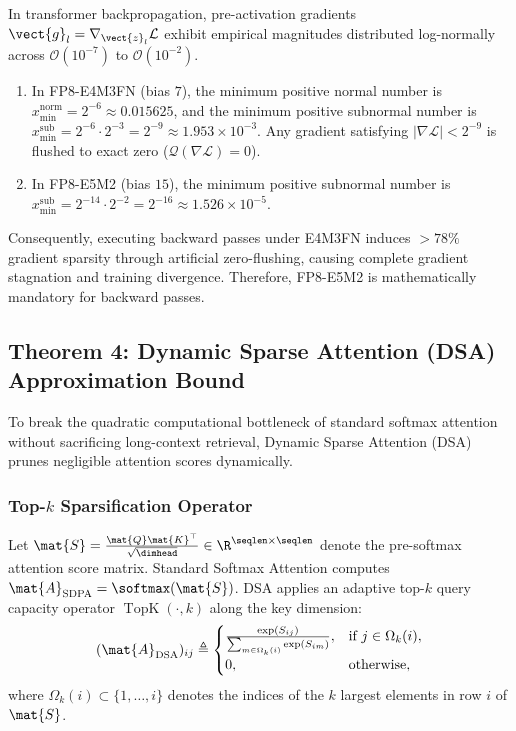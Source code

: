 \begin{proposition}
\label{prop:fp8_underflow}
In transformer backpropagation, pre-activation gradients $\vect{g}_l = \nabla_{\vect{z}_l} \mathcal{L}$ exhibit empirical magnitudes distributed log-normally across $\mathcal{O}(10^{-7})$ to $\mathcal{O}(10^{-2})$.
\begin{enumerate}
    \item In FP8-E4M3FN (bias $7$), the minimum positive normal number is $x_{\min}^{\text{norm}} = 2^{-6} \approx 0.015625$, and the minimum positive subnormal number is $x_{\min}^{\text{sub}} = 2^{-6} \cdot 2^{-3} = 2^{-9} \approx 1.953 \times 10^{-3}$. Any gradient satisfying $|\nabla \mathcal{L}| < 2^{-9}$ is flushed to exact zero ($\mathcal{Q}(\nabla \mathcal{L}) = 0$).
    \item In FP8-E5M2 (bias $15$), the minimum positive subnormal number is $x_{\min}^{\text{sub}} = 2^{-14} \cdot 2^{-2} = 2^{-16} \approx 1.526 \times 10^{-5}$.
\end{enumerate}
Consequently, executing backward passes under E4M3FN induces $> 78\%$ gradient sparsity through artificial zero-flushing, causing complete gradient stagnation and training divergence. Therefore, FP8-E5M2 is mathematically mandatory for backward passes.
\end{proposition}

\subsection{Theorem 4: Dynamic Sparse Attention (DSA) Approximation Bound}
\label{sec:thm_dsa_bound}

To break the quadratic computational bottleneck of standard softmax attention without sacrificing long-context retrieval, Dynamic Sparse Attention (DSA) prunes negligible attention scores dynamically.

\subsubsection{Top-$k$ Sparsification Operator}
Let $\mat{S} = \frac{\mat{Q} \mat{K}^\top}{\sqrt{\dimhead}} \in \R^{\seqlen \times \seqlen}$ denote the pre-softmax attention score matrix. Standard Softmax Attention computes $\mat{A}_{\text{SDPA}} = \softmax(\mat{S})$. DSA applies an adaptive top-$k$ query capacity operator $\operatorname{TopK}(\cdot, k)$ along the key dimension:
\begin{equation}
(\mat{A}_{\text{DSA}})_{ij} \triangleq \begin{cases}
\frac{\exp(S_{ij})}{\sum_{m \in \Omega_k(i)} \exp(S_{im})}, & \text{if } j \in \Omega_k(i), \\
0, & \text{otherwise},
\end{cases}
\label{eq:dsa_operator}
\end{equation}
where $\Omega_k(i) \subset \{1, \dots, i\}$ denotes the indices of the $k$ largest elements in row $i$ of $\mat{S}$.

